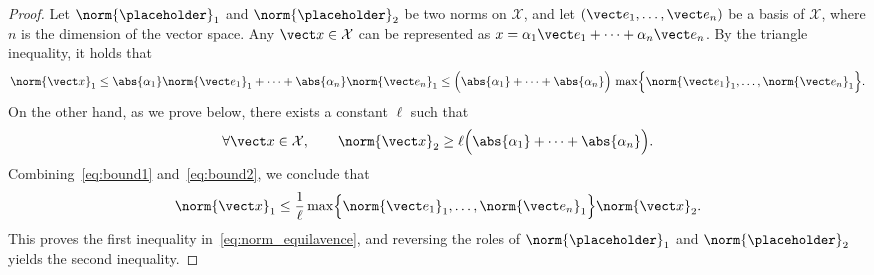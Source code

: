 \begin{proof}
    Let $\norm{\placeholder}_1$ and $\norm{\placeholder}_2$ be two norms on $\mathcal X$,
    and let $(\vect e_1, \dotsc, \vect e_n)$ be a basis of $\mathcal X$,
    where $n$ is the dimension of the vector space.
    Any $\vect x \in \mathcal X$ can be represented as $x = \alpha_1 \vect e_1 + \dotsb + \alpha_n \vect e_n$.
    By the triangle inequality,
    it holds that
    \begin{equation}
        \label{eq:bound1}
        \norm{\vect x}_1 \leq \abs{\alpha_1} \norm{\vect e_1}_1 + \dotsb + \abs{\alpha_n} \norm{\vect e_n}_1 \leq \Bigl(\abs{\alpha_1} + \dotsb + \abs{\alpha_n}\Bigr) \, \max \Bigl\{\norm{\vect e_1}_1, \dotsc, \norm{\vect e_n}_1\Bigr\}.
    \end{equation}
    On the other hand, as we prove below,
    there exists a constant $\ell$ such that
    \begin{equation}
        \label{eq:bound2}
        \forall \vect x \in \mathcal X, \qquad
        \norm{\vect x}_2
        \geq \ell \Bigl( \abs{\alpha_1} + \dotsb + \abs{\alpha_n} \Bigr).
    \end{equation}
    Combining~\eqref{eq:bound1} and~\eqref{eq:bound2},
    we conclude that
    \[
        \norm{\vect x}_1 \leq \frac{1}{\ell} \max \Bigl\{\norm{\vect e_1}_1, \dotsc, \norm{\vect e_n}_1\Bigr\} \norm{\vect x}_2.
    \]
    This proves the first inequality in~\eqref{eq:norm_equilavence},
    and reversing the roles of $\norm{\placeholder}_1$ and $\norm{\placeholder}_2$ yields the second inequality.


\end{proof}
